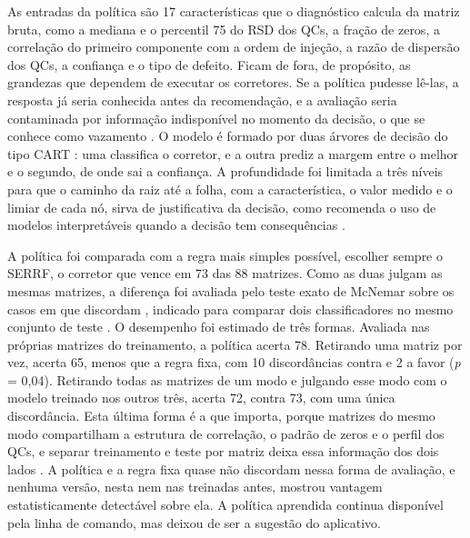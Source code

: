 As entradas da política são 17 características que o diagnóstico calcula da matriz bruta, como a mediana e o percentil 75 do RSD dos QCs, a fração de zeros, a correlação do primeiro componente com a ordem de injeção, a razão de dispersão dos QCs, a confiança e o tipo de defeito. Ficam de fora, de propósito, as grandezas que dependem de executar os corretores. Se a política pudesse lê-las, a resposta já seria conhecida antes da recomendação, e a avaliação seria contaminada por informação indisponível no momento da decisão, o que se conhece como vazamento \cite{kaufman2012leakage}. O modelo é formado por duas árvores de decisão do tipo CART \cite{breiman1984classification}: uma classifica o corretor, e a outra prediz a margem entre o melhor e o segundo, de onde sai a confiança. A profundidade foi limitada a três níveis para que o caminho da raiz até a folha, com a característica, o valor medido e o limiar de cada nó, sirva de justificativa da decisão, como recomenda o uso de modelos interpretáveis quando a decisão tem consequências \cite{rudin2019stop}.

A política foi comparada com a regra mais simples possível, escolher sempre o SERRF, o corretor que vence em 73 das 88 matrizes. Como as duas julgam as mesmas matrizes, a diferença foi avaliada pelo teste exato de McNemar sobre os casos em que discordam \cite{mcnemar1947note}, indicado para comparar dois classificadores no mesmo conjunto de teste \cite{dietterich1998approximate}. O desempenho foi estimado de três formas. Avaliada nas próprias matrizes do treinamento, a política acerta 78. Retirando uma matriz por vez, acerta 65, menos que a regra fixa, com 10 discordâncias contra e 2 a favor (\emph{p} = 0,04). Retirando todas as matrizes de um modo e julgando esse modo com o modelo treinado nos outros três, acerta 72, contra 73, com uma única discordância. Esta última forma é a que importa, porque matrizes do mesmo modo compartilham a estrutura de correlação, o padrão de zeros e o perfil dos QCs, e separar treinamento e teste por matriz deixa essa informação dos dois lados \cite{roberts2017cross}. A política e a regra fixa quase não discordam nessa forma de avaliação, e nenhuma versão, nesta nem nas treinadas antes, mostrou vantagem estatisticamente detectável sobre ela. A política aprendida continua disponível pela linha de comando, mas deixou de ser a sugestão do aplicativo.

